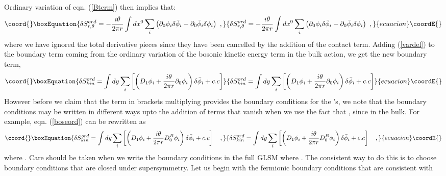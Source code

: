\documentclass[a4paper,12pt]{article}
\begin{document}
Ordinary variation of eqn. (\ref{Bterm}) then implies that:
\begin{equation}\coord{}\boxEquation{
\delta S^{ord}_{r,\theta}=-\frac{i\theta}{2\pi r}\int dx^0
\sum_i\left(\partial_0 \phi_i\delta{\bar \phi_i}-
\partial_0
{\bar \phi_i}\delta\phi_i\right)\ ,
\label{vardel}
}{
\delta S^{ord}_{r,\theta}=-\frac{i\theta}{2\pi r}\int dx^0
\sum_i\left(\partial_0 \phi_i\delta{\bar \phi_i}-
\partial_0
{\bar \phi_i}\delta\phi_i\right)\ ,
}{ecuacion}\coordE{}\end{equation}
where we have ignored the total derivative pieces 
since they have been cancelled by the addition of the contact
term. 
Adding (\ref{vardel}) to the boundary term coming from the ordinary 
variation of the bosonic kinetic energy term in the bulk action, 
we get the new boundary term,
\begin{equation}\coord{}\boxEquation{
\delta S^{ord}_{kin}=\int dy\sum_i\left[\left(D_1\phi_i
+\frac{i\theta}{2\pi r}\partial_0
\phi_i\right)\delta{\bar \phi_i}+c.c\right]
\label{boseord}
}{
\delta S^{ord}_{kin}=\int dy\sum_i\left[\left(D_1\phi_i
+\frac{i\theta}{2\pi r}\partial_0
\phi_i\right)\delta{\bar \phi_i}+c.c\right]
}{ecuacion}\coordE{}\end{equation}
However before we claim that the term in brackets multiplying
\coordHE{} provides the boundary conditions for the \myHighlight{$\phi$}\coordHE{}'s, 
we note that the boundary conditions may be written in different
ways upto the addition of terms that vanish when we use the fact that
\coordHE{}, since \coordHE{} in the bulk.
For example, eqn. (\ref{boseord}) can be rewritten as
\begin{equation}\coord{}\boxEquation{
\delta S^{ord}_{kin}=\int dy\sum_i\left[\left(D_1\phi_i
+\frac{i\theta}{2\pi r}D^B_0
\phi_i\right)\delta{\bar \phi_i}+c.c\right]\quad,
\label{boseord1}
}{
\delta S^{ord}_{kin}=\int dy\sum_i\left[\left(D_1\phi_i
+\frac{i\theta}{2\pi r}D^B_0
\phi_i\right)\delta{\bar \phi_i}+c.c\right]\quad,
}{ecuacion}\coordE{}\end{equation}
where \coordHE{}.
Care should be taken when we write the boundary conditions
in the full GLSM where \coordHE{}.
The consistent way to do this is to choose boundary
conditions that are closed under supersymmetry. 
Let us begin with the fermionic boundary conditions that are consistent with
\end{document}
